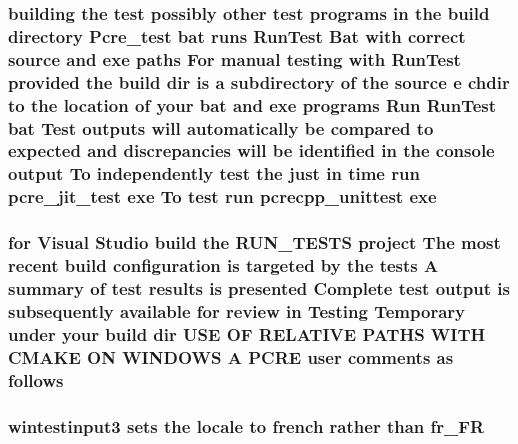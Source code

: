 \subsubsection[{\texorpdfstring{exe}{exe}}]{\setlength{\rightskip}{0pt plus 5cm}building the test possibly other test programs {\bf in} the build {\bf directory} Pcre\+\_\+test {\bf bat} runs Run\+Test Bat {\bf with} correct {\bf source} and exe paths For manual testing {\bf with} Run\+Test provided the build {\bf dir} {\bf is} {\bf a} subdirectory {\bf of} the {\bf source} {\bf e} chdir {\bf to} the {\bf location} {\bf of} your {\bf bat} and exe programs Run Run\+Test {\bf bat} Test outputs will automatically {\bf be} compared {\bf to} {\bf expected} and discrepancies will {\bf be} identified {\bf in} the console {\bf output} To independently test the just {\bf in} {\bf time} {\bf run} pcre\+\_\+jit\+\_\+test exe To test {\bf run} pcrecpp\+\_\+unittest exe}\hypertarget{NON-AUTOTOOLS-BUILD_8txt_acbd0f23c23794d564b69e37a52d93b23}{}\label{NON-AUTOTOOLS-BUILD_8txt_acbd0f23c23794d564b69e37a52d93b23}
\subsubsection[{\texorpdfstring{follows}{follows}}]{\setlength{\rightskip}{0pt plus 5cm}for Visual {\bf Studio} build the R\+U\+N\+\_\+\+T\+E\+S\+TS {\bf project} The most recent build configuration {\bf is} targeted by the {\bf tests} {\bf A} summary {\bf of} test {\bf results} {\bf is} presented Complete test {\bf output} {\bf is} subsequently {\bf available} for review {\bf in} Testing Temporary under your build {\bf dir} U\+SE OF R\+E\+L\+A\+T\+I\+VE P\+A\+T\+HS W\+I\+TH C\+M\+A\+KE ON W\+I\+N\+D\+O\+WS {\bf A} {\bf P\+C\+RE} user comments {\bf as} follows}\hypertarget{NON-AUTOTOOLS-BUILD_8txt_af49ea56690c7077f69f3ba8180a34190}{}\label{NON-AUTOTOOLS-BUILD_8txt_af49ea56690c7077f69f3ba8180a34190}
\subsubsection[{\texorpdfstring{fr\+\_\+\+FR}{fr_FR}}]{\setlength{\rightskip}{0pt plus 5cm}wintestinput3 sets the {\bf locale} {\bf to} french rather {\bf than} fr\+\_\+\+FR}\hypertarget{NON-AUTOTOOLS-BUILD_8txt_a61ca1880911d173a06d3f95ae9ed4f3b}{}\label{NON-AUTOTOOLS-BUILD_8txt_a61ca1880911d173a06d3f95ae9ed4f3b}
